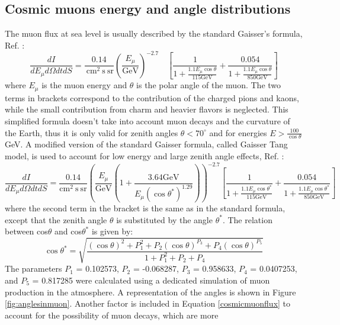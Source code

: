 \subsection{Cosmic muons energy and angle distributions}\label{distcos}
The muon flux at sea level is usually described by the standard Gaisser's formula, Ref. \cite{guan2015parametrization}:
\begin{equation}
    \frac{d I}{d E_\mu d \Omega d t d S}=\frac{0.14}{\mathrm{~cm}^2 \mathrm{~s} \ \mathrm{sr}}\left(\frac{E_\mu}{\mathrm{GeV}}\right)^{-2.7} \quad\left[\frac{1}{1+\frac{1.1 E_\mu \cos \theta}{115 \mathrm{GeV}}}+\frac{0.054}{1+\frac{1.1 E_\mu \cos \theta}{850 \mathrm{GeV}}}\right]
    \end{equation}
where $E_\mu$ is the muon energy and $\theta$ is the polar angle of the muon. 
The two terms in brackets correspond to the contribution of the charged pions and kaons, while 
the small contribution from charm and heavier flavors is neglected. 
This simplified formula doesn't take into account muon decays and the curvature of the Earth, 
thus it is only valid for zenith angles $\theta < 70^\circ$ and for energies $E > \frac{100}{\cos \theta}$ GeV.
A modified version of the standard Gaisser formula, called Gaisser Tang model, is used to account for low energy and large zenith angle effects, Ref. \cite{guan2015parametrization}:
\begin{equation}\label{cosmicmuonflux}
    \frac{d I}{d E_\mu d \Omega d t d S}=\frac{0.14}{\mathrm{cm}^2 \mathrm{~s} \ \mathrm{sr} }\left( \frac{E_\mu}{\mathrm{GeV}} \left(1+\frac{3.64 \mathrm{GeV}}{E_\mu\left(\cos \theta^*\right)^{1.29}}\right)\right)^{-2.7}\left[\frac{1}{1+\frac{1.1 E_\mu \cos \theta^*}{115 \mathrm{GeV}}}+\frac{0.054}{1+\frac{1.1 E_\mu \cos \theta^*}{850 \mathrm{GeV}}}\right]
\end{equation}
where the second term in the bracket is the same as in the standard formula, except that the zenith angle 
$\theta$ is substituted by the angle $\theta^*$. The relation between cos$\theta$
and cos$\theta^*$ is given by:
\begin{equation}
    \cos \theta^*=\sqrt{\frac{(\cos \theta)^2+P_1^2+P_2(\cos \theta)^{P_3}+P_4(\cos \theta)^{P_5}}{1+P_1^2+P_2+P_4}}
    \end{equation}
The parameters $P_1$ = 0.102573, $P_2$ = -0.068287, $P_3$ = 0.958633, $P_4$ = 0.0407253, and $P_5$ = 0.817285 were calculated using 
a dedicated simulation of muon production in the atmosphere. A representation of the angles is shown in Figure \ref{fig:anglesinmuon}.
Another factor is included in Equation \ref{cosmicmuonflux} to account for the possibility of muon decays, which are more 
